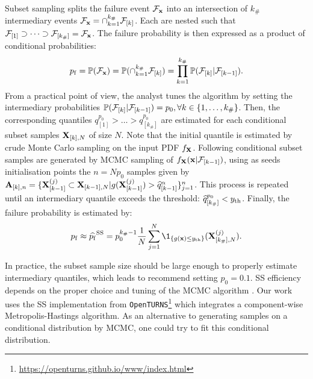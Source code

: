 Subset sampling splits the failure event $\mathcal{F}_{{\bf x}}$ into an intersection of $k_\#$ intermediary events $\mathcal{F}_{{\bf x}} = \cap_{k=1}^{k_\#} \mathcal{F}_{[k]}$.
Each are nested such that $\mathcal{F}_{[1]} \supset \dots \supset \mathcal{F}_{[k_\#]} = \mathcal{F}_{{\bf x}}$.
The failure probability is then expressed as a product of conditional probabilities:
\begin{equation}
    p_\mathrm{f} = \mathbb{P}(\mathcal{F}_{{\bf x}}) = \mathbb{P}(\cap_{k=1}^{k_\#} \mathcal{F}_{[k]}) = \prod_{k=1}^{k_\#} \mathbb{P}(\mathcal{F}_{[k]} | \mathcal{F}_{[k-1]}).
\end{equation}
From a practical point of view, the analyst tunes the algorithm by setting the intermediary probabilities $\mathbb{P}(\mathcal{F}_{[k]} | \mathcal{F}_{[k-1]}) = p_0, \forall k \in \{1, \dots, k_\# \}$. 
Then, the corresponding quantiles $q_{[1]}^{p_0} > \dots > q_{[k_\#]}^{p_0}$ are estimated for each conditional subset samples ${\bf X}_{[k], N}$ of size $N$. 
Note that the initial quantile is estimated by crude Monte Carlo sampling on the input PDF $f_{{\bf X}}$. 
Following conditional subset samples are generated by MCMC sampling of $f_{{\bf X}}({\bf x} |\mathcal{F}_{[k-1]})$, using as seeds initialisation points the $n= N p_0$ samples given by $\mathbf{A}_{[k], n}=\{{\bf X}_{[k-1]}^{(j)} \subset {\bf X}_{[k-1], N}| g({\bf X}_{[k-1]}^{(j)}) > \widehat{q}_{[k-1]}^\alpha \}_{j=1}^n$. 
This process is repeated until an intermediary quantile exceeds the threshold: $\widehat{q}_{[k_\#]}^{p_0} < y_\mathrm{th}$. 
Finally, the failure probability is estimated by:
\begin{equation}
    \pf \approx \widehat{\pf}^{\mathrm{SS}} = p_0^{k_\# -1} \frac1N \sum_{j=1}^N \1_{\{g(\bx) \leq \yth\}} (\bX_{[k_\#],N}^{(j)}).
\end{equation}

In practice, the subset sample size should be large enough to properly estimate intermediary quantiles, which leads \cite{AuBeck2001} to recommend setting $p_0=0.1$. SS efficiency depends on the proper choice and tuning of the MCMC algorithm \citep{Papaioannou_PEM_2015}. 
Our work uses the SS implementation from \texttt{OpenTURNS}\footnote{\href{https://openturns.github.io/www/index.html}{https://openturns.github.io/www/index.html}} \citep{baudin_dutfoy_2017} which integrates a component-wise Metropolis-Hastings algorithm. 
As an alternative to generating samples on a conditional distribution by MCMC, one could try to fit this conditional distribution.

